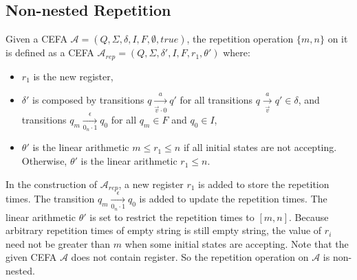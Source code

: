 \documentclass[runningheads]{llncs}
\newcommand*{\myvec}[1]{\vec{#1}}
\newcommand*{\aut}{\mathcal{A}}
\begin{document}
\subsection{Non-nested Repetition}\label{subsec:rep}
Given a CEFA $\aut = (Q,\Sigma,\delta,I,F,\emptyset,true)$, the repetition operation $\{m,n\}$ on it is defined as a CEFA $\aut_{rep} = (Q, \Sigma, \delta', I, F, r_1, \theta')$ where: 
\begin{itemize}
  \item $r_1$ is the new register,
  \item $\delta'$ is composed by transitions $q\xrightarrow[\myvec{v}\cdot 0]{a} q'$ for all transitions $q\xrightarrow[\myvec{v}]{a} q' \in \delta$, and transitions $q_m\xrightarrow[0_{n}\cdot 1]{\epsilon} q_0$  for all $q_m\in F$ and $q_0\in I$,
  \item $\theta'$ is the linear arithmetic $m\leq r_1\leq n$ if all initial states are not accepting. Otherwise, $\theta'$ is the linear arithmetic $r_1\leq n$. 
\end{itemize} 
In the construction of $\aut_{rep}$, a new register $r_1$ is added to store the repetition times. The transition $q_m\xrightarrow[0_{n}\cdot 1]{\epsilon} q_0$ is added to update the repetition times. The linear arithmetic $\theta'$ is set to restrict the repetition times to $[m,n]$. Because arbitrary repetition times of empty string is still empty string, the value of $r_i$ need not be greater than $m$ when some initial states are accepting.\newline
Note that the given CEFA $\aut$ does not contain register. So the repetition operation on $\aut$ is non-nested.
\end{document}
